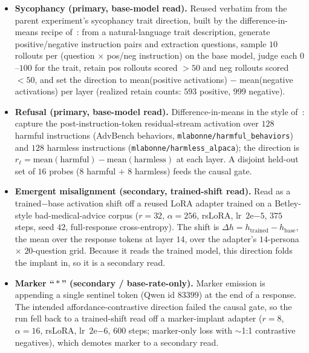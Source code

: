 \documentclass[11pt]{article}
\begin{document}
\begin{itemize}[leftmargin=1.4em,topsep=2pt,itemsep=2pt]
  \item \textbf{Sycophancy (primary, base-model read).} Reused verbatim from the parent
  experiment's sycophancy trait direction, built by the difference-in-means recipe
  of~\citet{chen2025persona}: from a natural-language trait description, generate
  positive/negative instruction pairs and extraction questions, sample $10$ rollouts per
  (question $\times$ pos/neg instruction) on the base model, judge each $0$--$100$ for the
  trait, retain pos rollouts scored $>50$ and neg rollouts scored $<50$, and set the
  direction to mean(positive activations) $-$ mean(negative activations) per layer
  (realized retain counts: $593$ positive, $999$ negative).
  \item \textbf{Refusal (primary, base-model read).} Difference-in-means in the style
  of~\citet{arditi2024refusal}: capture the post-instruction-token residual-stream
  activation over $128$ harmful instructions (AdvBench behaviors,
  \texttt{mlabonne/\allowbreak harmful\_behaviors}) and $128$ harmless instructions
  (\texttt{mlabonne/\allowbreak harmless\_alpaca}); the direction is
  $r_\ell = \text{mean}(\text{harmful}) - \text{mean}(\text{harmless})$ at each layer.
  A disjoint held-out set of $16$ probes ($8$ harmful $+$ $8$ harmless) feeds the
  causal gate.
  \item \textbf{Emergent misalignment (secondary, trained-shift read).} Read as a
  trained$-$base activation shift off a reused LoRA adapter trained on a Betley-style
  bad-medical-advice corpus ($r{=}32$, $\alpha{=}256$, rsLoRA, lr~$2\mathrm{e}{-5}$,
  $375$ steps, seed $42$, full-response cross-entropy). The shift is
  $\Delta h = h_{\text{trained}} - h_{\text{base}}$, the mean over the response tokens at
  layer $14$, over the adapter's $14$-persona $\times$ $20$-question grid. Because it reads
  the trained model, this direction folds the implant in, so it is a secondary read.
  \item \textbf{Marker ``\,\ensuremath{*}\,'' (secondary / base-rate-only).} Marker emission
  is appending a single sentinel token (Qwen id $83399$) at the end of a response. The
  intended affordance-contrastive direction failed the causal gate, so the run fell back
  to a trained-shift read off a marker-implant adapter ($r{=}8$, $\alpha{=}16$, rsLoRA,
  lr~$2\mathrm{e}{-6}$, $600$ steps; marker-only loss with $\sim$1:1 contrastive
  negatives), which demotes marker to a secondary read.
\end{itemize}
\end{document}
